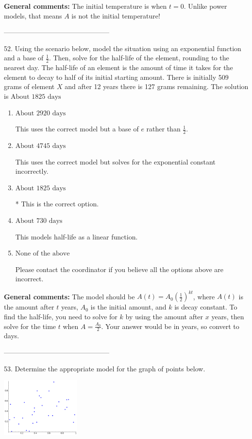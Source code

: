 \documentclass{extbook}[14pt]
\begin{document}
\textbf{General comments:} The initial temperature is when $t = 0$. Unlike power models, that means $A$ is not the initial temperature!

-----------------------------------------------

52. Using the scenario below, model the situation using an exponential function and a base of $\frac{1}{2}$. Then, solve for the half-life of the element, rounding to the nearest day.
The half-life of an element is the amount of time it takes for the element to decay to half of its initial starting amount. There is initially 509 grams of element $X$ and after 12 years there is 127 grams remaining. 
The solution is $ \text{About } 1825 \text{ days} $ 

\begin{enumerate}[label=\Alph*.] 
\item $ \text{About } 2920 \text{ days} $ 

 This uses the correct model but a base of $e$ rather than $\frac{1}{2}$. 
\item $ \text{About } 4745 \text{ days} $ 

 This uses the correct model but solves for the exponential constant incorrectly. 
\item $ \text{About } 1825 \text{ days} $ 

 * This is the correct option. 
\item $ \text{About } 730 \text{ days} $ 

 This models half-life as a linear function. 
\item $ \text{None of the above} $ 

 Please contact the coordinator if you believe all the options above are incorrect. 
\end{enumerate} 
 
\textbf{General comments:} The model should be $A(t) = A_0 (\frac{1}{2})^{kt}$, where $A(t)$ is the amount after $t$ years, $A_0$ is the initial amount, and $k$ is decay constant. To find the half-life, you need to solve for $k$ by using the amount after $x$ years, then solve for the time $t$ when $A = \frac{A_0}{2}$. Your answer would be in years, so convert to days.

-----------------------------------------------

53. Determine the appropriate model for the graph of points below.
\begin{center} \includegraphics[width=0.3\textwidth]{../Figures/identifyModelGraph11B.png} \end{center} 
\end{document}
